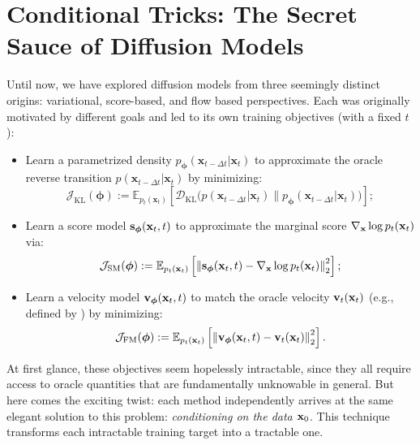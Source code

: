 \section{Conditional Tricks: The Secret Sauce of Diffusion Models}\label{sec:conditional-trick}
Until now, we have explored diffusion models from three seemingly distinct origins: variational, score-based, and flow based perspectives. Each was originally motivated by different goals and led to its own training objectives (with a fixed $t$):
\begin{itemize}
    \item {} Learn a parametrized density $p_{\bm{\phi}}(\mathbf{x}_{t-\Delta t}|\mathbf{x}_t)$ to approximate the oracle reverse transition $p(\mathbf{x}_{t-\Delta t}|\mathbf{x}_t)$ by minimizing:
    \[
    \mathcal{J}_{\text{KL}}(\bm{\phi}) := \mathbb{E}_{p_t(\mathbf{x}_t)}\left[
        \mathcal{D}_{\mathrm{KL}}\big(p(\mathbf{x}_{t-\Delta t}|\mathbf{x}_t) \| p_{\bm{\phi}}(\mathbf{x}_{t-\Delta t}|\mathbf{x}_t)\big)
    \right];
    \]
    \item {} Learn a score model ${\mathbf{s}}_{\bm{\phi}}({\mathbf{x}}_t, t)$ to approximate the marginal score $\nabla_{{\mathbf{x}}} \log p_t({\mathbf{x}}_t)$ via:
    \[
    \mathcal{J}_{\text{SM}}(\bm{\phi}) := \mathbb{E}_{p_t({\mathbf{x}}_t)}\left[
       \left\| {\mathbf{s}}_{\bm{\phi}}({\mathbf{x}}_t, t) - \nabla_{{\mathbf{x}}} \log p_t({\mathbf{x}}_t) \right\|_2^2
    \right];
    \]
    \item {} Learn a velocity model ${\mathbf{v}}_{\bm{\phi}}({\mathbf{x}}_t, t)$ to match the oracle velocity ${\mathbf{v}}_t({\mathbf{x}}_t)$ (e.g., defined by ) by minimizing:
    \[
    \mathcal{J}_{\text{FM}}(\bm{\phi}) := \mathbb{E}_{p_t({\mathbf{x}}_t)} \left[
        \left\| {\mathbf{v}}_{\bm{\phi}}({\mathbf{x}}_t, t) - {\mathbf{v}}_t({\mathbf{x}}_t) \right\|_2^2
    \right].
    \]
\end{itemize}

At first glance, these objectives seem hopelessly intractable, since they all require access to oracle quantities that are fundamentally unknowable in general. But here comes the exciting twist: each method independently arrives at the same elegant solution to this problem: \emph{conditioning on the data ${\mathbf{x}}_0$}. This technique transforms each intractable training target into a tractable one.



